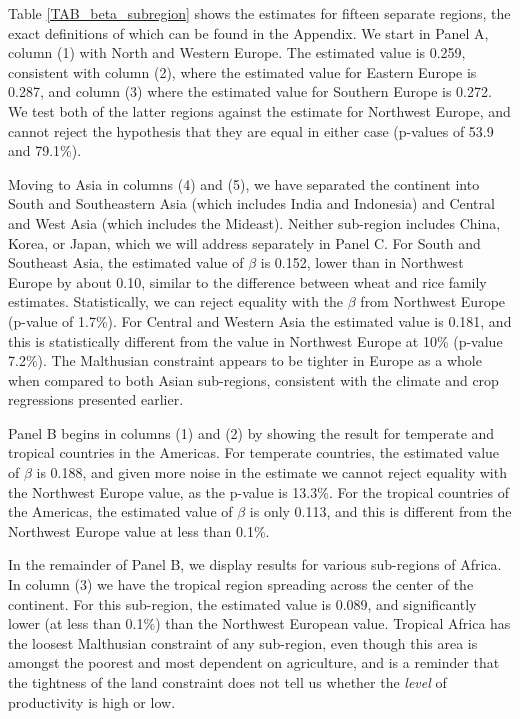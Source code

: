 \documentclass[11pt]{article}
\begin{document}
Table \ref{TAB_beta_subregion} shows the estimates for fifteen separate regions, the exact definitions of which can be found in the Appendix. We start in Panel A, column (1) with North and Western Europe. The estimated value is 0.259, consistent with column (2), where the estimated value for Eastern Europe is 0.287, and column (3) where the estimated value for Southern Europe is 0.272. We test both of the latter regions against the estimate for Northwest Europe, and cannot reject the hypothesis that they are equal in either case (p-values of 53.9 and 79.1\%). 

Moving to Asia in columns (4) and (5), we have separated the continent into South and Southeastern Asia (which includes India and Indonesia) and Central and West Asia (which includes the Mideast). Neither sub-region includes China, Korea, or Japan, which we will address separately in Panel C. For South and Southeast Asia, the estimated value of $\beta$ is 0.152, lower than in Northwest Europe by about 0.10, similar to the difference between wheat and rice family estimates. Statistically, we can reject equality with the $\beta$ from Northwest Europe (p-value of 1.7\%). For Central and Western Asia the estimated value is 0.181, and this is statistically different from the value in Northwest Europe at 10\% (p-value 7.2\%). The Malthusian constraint appears to be tighter in Europe as a whole when compared to both Asian sub-regions, consistent with the climate and crop regressions presented earlier.

Panel B begins in columns (1) and (2) by showing the result for temperate and tropical countries in the Americas. For temperate countries, the estimated value of $\beta$ is 0.188, and given more noise in the estimate we cannot reject equality with the Northwest Europe value, as the p-value is 13.3\%. For the tropical countries of the Americas, the estimated value of $\beta$ is only 0.113, and this is different from the Northwest Europe value at less than 0.1\%.

In the remainder of Panel B, we display results for various sub-regions of Africa. In column (3) we have the tropical region spreading across the center of the continent. For this sub-region, the estimated value is 0.089, and significantly lower (at less than 0.1\%) than the Northwest European value. Tropical Africa has the loosest Malthusian constraint of any sub-region, even though this area is amongst the poorest and most dependent on agriculture, and is a reminder that the tightness of the land constraint does not tell us whether the \textit{level} of productivity is high or low.
\end{document}
